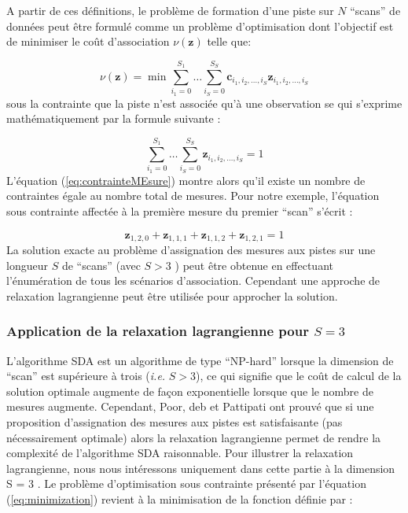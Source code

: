 \documentclass[10pt,french,a4paper]{report}
\begin{document}
A partir de ces définitions, le problème de formation d'une piste sur $N$ ``scans'' de données peut être formulé comme un problème d'optimisation dont l'objectif est de minimiser le coût d'association $\nu(\mathbf{z})$ telle que:

 	 	   \begin{equation}  
 	 	   \label{eq:minimization}
\nu(\mathbf{z})  =\min\sum_{i_1=0}^{S_1}\ldots\sum_{i_S=0}^{S_S}\mathbf{c}_{i_1,i_2, \ldots,i_S}\mathbf{z}_{i_{1},i_{2}, \ldots,i_{S}}
 	    \end{equation}
sous la contrainte que la piste n'est associée qu'à une observation se qui s'exprime mathématiquement par la
formule suivante :

 	 	   \begin{equation}  
 	 	    \label{eq:contrainteMEsure}
 \sum_{i_1=0}^{S_1}\ldots\sum_{i_S=0}^{S_S} \mathbf{z}_{i_{1},i_{2}, \ldots,i_{S}}=1
 	    \end{equation}
L'équation (\ref{eq:contrainteMEsure}) montre alors qu'il existe un nombre de contraintes égale au nombre total de mesures. Pour
notre exemple, l'équation sous contrainte affectée à la première mesure du premier ``scan'' s'écrit : 	    

 	 	   \begin{equation}  
 \mathbf{z}_{1,2,0} +  \mathbf{z}_{1,1,1} +  \mathbf{z}_{1,1,2} + \mathbf{z}_{1,2,1} = 1 
 	    \end{equation}
La solution exacte au problème d'assignation des mesures aux pistes sur une longueur $S$ de ``scans'' (avec $S > 3$ )
peut être obtenue en effectuant l'énumération de tous les scénarios d'association. Cependant une approche de
relaxation lagrangienne peut être utilisée pour approcher la solution.
 	    
\subsubsection{Application de la relaxation lagrangienne pour $S = 3$}
L'algorithme \ac{SDA} est un algorithme de type ``NP-hard'' lorsque la dimension de ``scan'' est supérieure
à trois (\textit{i.e.} $S > 3$), ce qui signifie que le coût de calcul de la solution optimale augmente de façon exponentielle lorsque que le nombre de mesures augmente. Cependant, Poor, deb et Pattipati \cite{Pattipati1992} ont prouvé que si une proposition d'assignation des mesures aux pistes est satisfaisante (pas nécessairement optimale) alors la
relaxation lagrangienne permet de rendre la complexité de l'algorithme \ac{SDA} raisonnable.
Pour illustrer la relaxation lagrangienne, nous nous intéressons uniquement dans cette partie à la dimension
S = 3 . Le problème d'optimisation sous contrainte présenté par l'équation (\ref{eq:minimization}) revient à la minimisation de la
fonction définie par :
\end{document}
